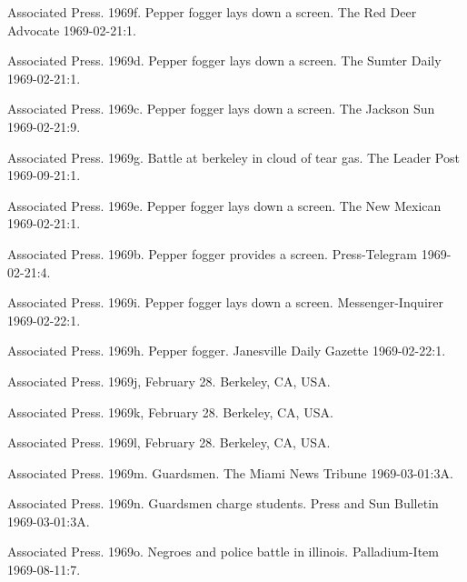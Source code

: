 \documentclass[
  11pt,
]{krantz}
\newlength{\cslhangindent}
\newenvironment{CSLReferences}[2] %
 {%
  \setlength{\parindent}{0pt}
  \ifodd #1 \everypar{\setlength{\hangindent}{\cslhangindent}}\ignorespaces\fi
  \ifnum #2 > 0
  \setlength{\parskip}{#2\baselineskip}
  \fi
 }%
 {}
\begin{document}
\begin{CSLReferences}{1}{0}
\leavevmode{}%
Associated Press. 1969f. Pepper fogger lays down a screen. The Red Deer Advocate 1969-02-21:1.

\leavevmode{}%
Associated Press. 1969d. Pepper fogger lays down a screen. The Sumter Daily 1969-02-21:1.

\leavevmode{}%
Associated Press. 1969c. Pepper fogger lays down a screen. The Jackson Sun 1969-02-21:9.

\leavevmode{}%
Associated Press. 1969g. Battle at berkeley in cloud of tear gas. The Leader Post 1969-09-21:1.

\leavevmode{}%
Associated Press. 1969e. Pepper fogger lays down a screen. The New Mexican 1969-02-21:1.

\leavevmode{}%
Associated Press. 1969b. Pepper fogger provides a screen. Press-Telegram 1969-02-21:4.

\leavevmode{}%
Associated Press. 1969i. Pepper fogger lays down a screen. Messenger-Inquirer 1969-02-22:1.

\leavevmode{}%
Associated Press. 1969h. Pepper fogger. Janesville Daily Gazette 1969-02-22:1.

\leavevmode{}%
Associated Press. 1969j, February 28. Berkeley, CA, USA.

\leavevmode{}%
Associated Press. 1969k, February 28. Berkeley, CA, USA.

\leavevmode{}%
Associated Press. 1969l, February 28. Berkeley, CA, USA.

\leavevmode{}%
Associated Press. 1969m. Guardsmen. The Miami News Tribune 1969-03-01:3A.

\leavevmode{}%
Associated Press. 1969n. Guardsmen charge students. Press and Sun Bulletin 1969-03-01:3A.

\leavevmode{}%
Associated Press. 1969o. Negroes and police battle in illinois. Palladium-Item 1969-08-11:7.


\end{CSLReferences}
\end{document}
